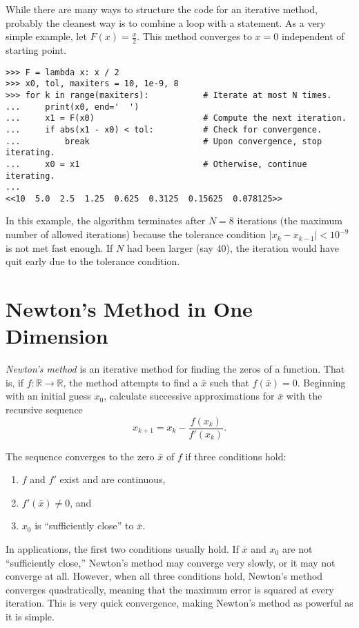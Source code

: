 While there are many ways to structure the code for an iterative method, probably the cleanest way is to combine a  loop with a  statement.
As a very simple example, let $F(x) = \frac{x}{2}$.
This method converges to $x = 0$ independent of starting point.

\begin{lstlisting}
>>> F = lambda x: x / 2
>>> x0, tol, maxiters = 10, 1e-9, 8
>>> for k in range(maxiters):           # Iterate at most N times.
...     print(x0, end='  ')
...     x1 = F(x0)                      # Compute the next iteration.
...     if abs(x1 - x0) < tol:          # Check for convergence.
...         break                       # Upon convergence, stop iterating.
...     x0 = x1                         # Otherwise, continue iterating.
...
<<10  5.0  2.5  1.25  0.625  0.3125  0.15625  0.078125>>
\end{lstlisting}

In this example, the algorithm terminates after $N=8$ iterations (the maximum number of allowed iterations) because the tolerance condition $|x_k - x_{k-1}| < 10^{-9}$ is not met fast enough.
If $N$ had been larger (say $40$), the iteration would have quit early due to the tolerance condition.

\section*{Newton's Method in One Dimension} %

\emph{Newton's method} is an iterative method for finding the zeros of a function.
That is, if $f:\mathbb{R}\rightarrow\mathbb{R}$, the method attempts to find a $\bar{x}$ such that $f(\bar{x}) = 0$.
Beginning with an initial guess $x_0$, calculate successive approximations for $\bar{x}$ with the recursive sequence
\begin{equation}
x_{k+1} = x_k - \frac{f(x_k)}{f'(x_k)}.
\label{eq:newton-1d-def}
\end{equation}

The sequence converges to the zero $\bar{x}$ of $f$ if three conditions hold:
\begin{enumerate}
\item $f$ and $f'$ exist and are continuous,
\item $f'(\bar{x})\neq0$, and
\item $x_0$ is ``sufficiently close'' to $\bar{x}$.
\end{enumerate}
In applications, the first two conditions usually hold.
If $\bar{x}$ and $x_0$ are not ``sufficiently close,'' Newton's method may converge very slowly, or it may not converge at all.
However, when all three conditions hold, Newton's method converges quadratically, meaning that the maximum error is squared at every iteration.
This is very quick convergence, making Newton's method as powerful as it is simple.

